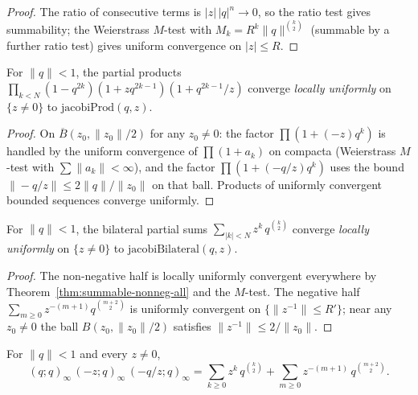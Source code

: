 \begin{proof}\leanok
The ratio of consecutive terms is $|z|\,|q|^n \to 0$, so the ratio test gives
summability; the Weierstrass $M$-test with $M_k = R^k \|q\|^{\binom{k}{2}}$
(summable by a further ratio test) gives uniform convergence on
$|z| \le R$.
\end{proof}

\begin{theorem}\label{thm:jacobi-prod-luc}\leanok{}
For $\|q\| < 1$, the partial products
$\prod_{k < N}(1 - q^{2k})(1 + zq^{2k-1})(1 + q^{2k-1}/z)$ converge
\emph{locally uniformly} on $\{z \neq 0\}$ to $\mathrm{jacobiProd}(q,z)$.
\end{theorem}

\begin{proof}\leanok
On $\overline{B}(z_0, \|z_0\|/2)$ for any $z_0 \neq 0$: the factor
$\prod(1 + (-z)q^k)$ is handled by the uniform convergence of
$\prod(1 + a_k)$ on compacta (Weierstrass $M$-test with
$\sum \|a_k\| < \infty$), and the factor $\prod(1 + (-q/z)q^k)$ uses the
bound $\|-q/z\| \le 2\|q\|/\|z_0\|$ on that ball. Products of uniformly
convergent bounded sequences converge uniformly.
\end{proof}

\begin{theorem}\label{thm:jacobi-series-luc}\leanok{}
For $\|q\| < 1$, the bilateral partial sums
$\sum_{|k| < N} z^k\, q^{\binom{k}{2}}$ converge \emph{locally uniformly}
on $\{z \neq 0\}$ to $\mathrm{jacobiBilateral}(q,z)$.
\end{theorem}

\begin{proof}\leanok
The non-negative half is locally uniformly convergent everywhere by
Theorem~\ref{thm:summable-nonneg-all} and the $M$-test. The negative half
$\sum_{m \ge 0} z^{-(m+1)} q^{\binom{m+2}{2}}$ is uniformly convergent on
$\{\|z^{-1}\| \le R'\}$; near any $z_0 \neq 0$ the ball
$B(z_0, \|z_0\|/2)$ satisfies $\|z^{-1}\| \le 2/\|z_0\|$.
\end{proof}

\begin{theorem}\label{thm:jtp-analytic}\leanok{}
For $\|q\| < 1$ and every $z \neq 0$,
\[
  (q;q)_\infty\,(-z;q)_\infty\,(-q/z;q)_\infty
    = \sum_{k \ge 0} z^k\, q^{\binom{k}{2}}
    + \sum_{m \ge 0} z^{-(m+1)}\, q^{\binom{m+2}{2}}.
\]
\end{theorem}

